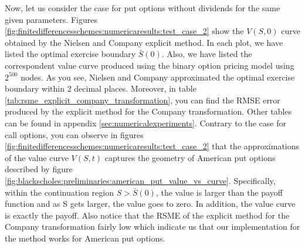 Now, let us consider the case for put options without dividends for the same given parameters. Figures \eqref{fig:finitedifferencesschemes:numericaresults:test_case_2} show the $V(S, 0)$ curve obtained by the Nielsen and Company explicit method. In each plot, we have listed the optimal exercise boundary $\bar{S}(0)$. Also, we have listed the correspondent value curve produced using the binary option pricing model using $2^{500}$ nodes. As you see, Nielsen and Company approximated the optimal exercise boundary within 2 decimal places. Moreover, in table \eqref{tab:rsme_explicit_company_transformation}, you can find the RMSE error produced by the explicit method for the Company transformation. Other tables can be found in appendix \eqref{sec:numericalexperiments}.  Contrary to the case for call options, you can observe in figures \eqref{fig:finitedifferencesschemes:numericaresults:test_case_2} that the approximations of the value curve $V(S,t)$ captures the geometry of American put options described by figure \eqref{fig:blackscholes:preliminaries:american_put_value_vs_curve}. Specifically, within the continuation region $S>\bar{S}(0)$, the value is larger than the payoff function and as S gets larger, the value goes to zero. In addition, the value curve is exactly the payoff. Also notice that the RSME of the explicit method for the Company transformation fairly low which indicate us that our implementation for the method works for American put options.

